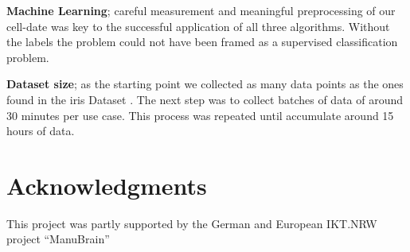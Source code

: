 \documentclass[5p,times,procedia]{elsarticle}
\begin{document}
\textbf{Machine Learning}; careful measurement and  meaningful preprocessing
of our cell-date was key to the successful application of all three algorithms.
Without the labels the problem could not have been framed as a supervised 
classification problem.

\textbf{Dataset size}; as the starting point we collected as many data points as the ones found in the iris Dataset \cite{fisher_1936}. The next step was to collect batches of data of around 30 minutes per use case. This process was repeated until accumulate around 15 hours of data.

\section*{Acknowledgments}
This project was partly supported by the German and European IKT.NRW
project "`ManuBrain"' 



\end{document}
